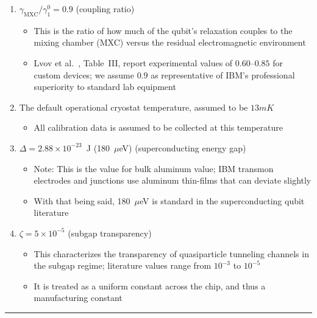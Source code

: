\documentclass[showpacs,amsmath,amssymb,twocolumn,superscriptaddress,notitlepage,preprintnumbers,pra]{revtex4-1}
\begin{document}
\begin{enumerate}
	\item $\gamma_\mathrm{MXC}/\gamma_1^0 = 0.9$ (coupling ratio)
	      \begin{itemize}
		      \item This is the ratio of how much of the qubit's relaxation couples to the mixing chamber (MXC) versus the residual electromagnetic environment
		      \item Lvov et al.~\cite{lvov2025thermometry}, Table~III, report experimental values of $0.60$--$0.85$ for custom devices; we assume $0.9$ as representative of IBM's professional superiority to standard lab equipment
	      \end{itemize}

	\item The default operational cryostat temperature, assumed to be $13mK$
	      \begin{itemize}
		      \item All calibration data is assumed to be collected at this temperature
	      \end{itemize}

	\item $\Delta = 2.88 \times 10^{-23}$~J (180~$\mu$eV) (superconducting energy gap)
	      \begin{itemize}
		      \item Note: This is the value for bulk aluminum value; IBM transmon electrodes and junctions use aluminum thin-films that can deviate slightly
		      \item With that being said, 180~$\mu$eV is standard in the superconducting qubit literature~\cite{catelani2011qp_relaxation}
	      \end{itemize}

	\item $\zeta = 5 \times 10^{-5}$ (subgap transparency)
	      \begin{itemize}
		      \item This characterizes the transparency of quasiparticle tunneling channels in the subgap regime; literature values range from $10^{-3}$ to $10^{-5}$~\cite{catelani2012qp_diffusion}
		      \item It is treated as a uniform constant across the chip, and thus a manufacturing constant
	      \end{itemize}
\end{enumerate}

\noindent\rule{0.5\textwidth}{0.4pt}
\end{document}
